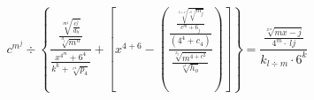 \documentclass[10pt,a4paper]{book}
\begin{document}
$${c^{m^j}}\div{\left\{\frac{\frac{\sqrt[m^4]{\frac{c^j}{d_h}}}{\sqrt[d_j]{m^n}}}{\frac{x^{4^m}+6^4}{k^k+\sqrt[c^4]{p_4}}}+\left[x^{4+6}-\left(\frac{\frac{\frac{\sqrt[4+c]{\sqrt[c^j]{m_j}}}{c^m+6_j}}{\left(4^4+c_4\right)}}{\frac{\sqrt[x_j]{m^{4+c^2}}}{\sqrt[c^4]{h_o}}}\right)\right]\right\}}=\frac{\frac{\sqrt[x^m]{mx-j}}{4^m\cdot \:lj}}{k_{l\div m}\cdot 6^k}$$
\end{document}
